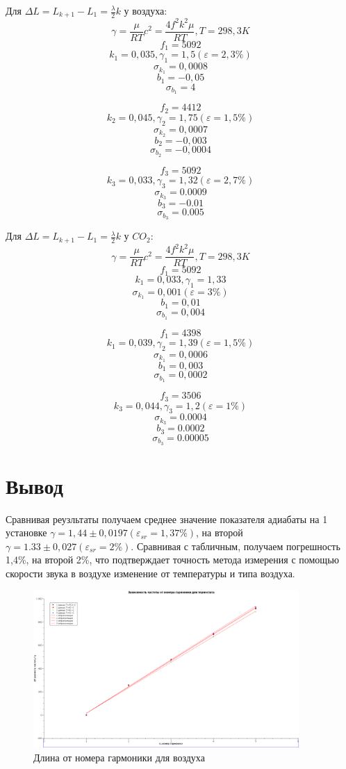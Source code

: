 \documentclass[a4paper, 12pt]{article}
\begin{document}
Для $\Delta L = L_{k+1} - L_{1}= \frac{\lambda}{2}k$ у воздуха:
\[\gamma = \frac{\mu}{RT}c^2 = \frac{4f^2k^2\mu}{RT}, T = 298,3 K\]
\[f_1 = 5092\]
\[k_1 = 0,035, \gamma_1 = 1,5(\varepsilon = 2,3\%)\]
\[\sigma_{k_1} = 0,0008\]
\[b_1 = -0,05\]
\[\sigma_{b_1} = 4\]

\[f_2 = 4412\]
\[k_2 = 0,045, \gamma_2 = 1,75(\varepsilon = 1,5\%)\]
\[\sigma_{k_2} = 0,0007\]
\[b_2 = -0,003\]
\[\sigma_{b_2} = -0,0004\]

\[f_3 = 5092\]
\[k_3 = 0,033, \gamma_3 = 1,32(\varepsilon = 2,7\%)\]
\[\sigma_{k_3} = 0.0009\]
\[b_3 = -0.01\]
\[\sigma_{b_3} = 0.005\]

Для $\Delta L = L_{k+1} - L_{1}= \frac{\lambda}{2}k$ у $CO_2$:
\[\gamma = \frac{\mu}{RT}c^2 = \frac{4f^2k^2\mu}{RT}, T = 298,3 K\]
\[f_1 = 5092\]
\[k_1 = 0,033, \gamma_1 = 1,33\]
\[\sigma_{k_1} = 0,001(\varepsilon = 3\%)\]
\[b_1 = 0,01\]
\[\sigma_{b_1} = 0,004\]

\[f_1 = 4398\]
\[k_1 = 0,039, \gamma_2 = 1,39(\varepsilon = 1,5\%)\]
\[\sigma_{k_1} = 0,0006\]
\[b_1 = 0,003\]
\[\sigma_{b_1} = 0,0002\]

\[f_3 = 3506\]
\[k_3 = 0,044, \gamma_3 = 1,2(\varepsilon = 1\%)\]
\[\sigma_{k_3} = 0.0004\]
\[b_3 = 0.0002\]
\[\sigma_{b_3} = 0.00005\]

\section{Вывод}

Сравнивая реузльтаты получаем среднее значение показателя адиабаты на 1 установке $\gamma = 1,44 \pm 0,0197 (\varepsilon_{sr} = 1,37\%)$, на второй $\gamma = 1.33 \pm 0,027 (\varepsilon_{sr} = 2\%)$.
Сравнивая с табличным, получаем погрешность 1,4\%, на второй 2\%, что подтверждает точность метода измерения с помощью скорости звука в воздухе изменение от температуры и типа воздуха.

\newpage

\begin{figure}[!p]
    \centering
    \includegraphics[width=0.9\textwidth]{graphic1.png}
    \caption{Длина от номера гармоники для воздуха}
\end{figure}
\end{document}
